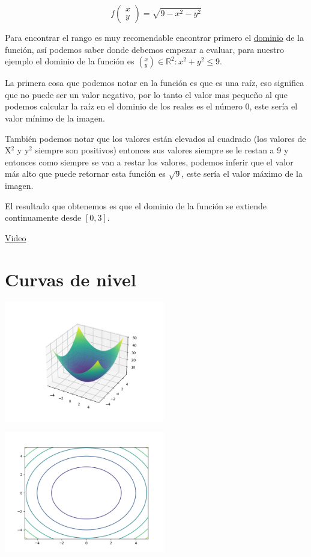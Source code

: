 \documentclass[11pt]{article}
\begin{document}
\begin{DEMONSTRATION}
\[ f \begin{pmatrix} x \\ y \end{pmatrix} = \sqrt{9-x^2-y^2} \]
\end{DEMONSTRATION}

Para encontrar el rango es muy recomendable encontrar primero el \hyperref[sec:org8660baa]{dominio} de la función, así podemos saber donde debemos empezar a evaluar, para nuestro ejemplo el dominio de la función es \({ (^x_y) \in \mathbb R^2: x^2 + y^2 \leq 9 }\).

La primera cosa que podemos notar en la función es que es una raíz, eso significa que no puede ser un valor negativo, por lo tanto el valor mas pequeño al que podemos calcular la raíz en el dominio de los reales es el número 0, este sería el valor mínimo de la imagen.

También podemos notar que los valores están elevados al cuadrado (los valores de X\(^{\text{2}}\) y y\(^{\text{2}}\) siempre son positivos) entonces sus valores siempre se le restan a 9 y entonces como siempre se van a restar los valores, podemos inferir que el valor más alto que puede retornar esta función es \(\sqrt{9}\), este sería el valor máximo de la imagen. 

El resultado que obtenemos es que el dominio de la función se extiende continuamente desde \([0, 3]\).

\href{https://youtu.be/qDr0R7hIjts}{Video}

\section{Curvas de nivel}
\label{sec:orgf6fb0b6}

\begin{center}
\begin{center}
\includegraphics[width=7cm]{./img/test.png}
\end{center}

\begin{center}
\includegraphics[width=7cm]{./img/test2.png}
\end{center}
\end{center}
\end{document}
